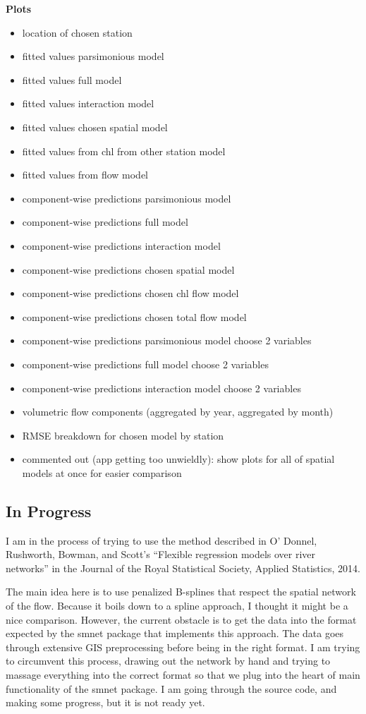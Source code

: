 \documentclass[12pt]{amsart}
\begin{document}
\textbf{Plots}
\begin{itemize}
\item location of chosen station
\item fitted values parsimonious model
\item fitted values full model
\item fitted values interaction model
\item fitted values chosen spatial model
\item fitted values from chl from other station model
\item fitted values from flow model
\item component-wise predictions parsimonious model
\item component-wise predictions full model
\item component-wise predictions interaction model
\item component-wise predictions chosen spatial model
\item component-wise predictions chosen chl flow model
\item component-wise predictions chosen total flow model
\item component-wise predictions parsimonious model choose 2 variables
\item component-wise predictions full model choose 2 variables
\item component-wise predictions interaction model choose 2 variables
\item volumetric flow components (aggregated by year, aggregated by month)
\item RMSE breakdown for chosen model by station
\item commented out (app getting too unwieldly): show plots for all of spatial models at once for easier comparison
\end{itemize}




\subsection{In Progress}

I am in the process of trying to use the method described in  O' Donnel, Rushworth, Bowman, and Scott's ``Flexible regression models over river networks'' in the Journal of the Royal Statistical Society, Applied Statistics, 2014.

The main idea here is to use penalized B-splines that respect the spatial network of the flow. Because it boils down to a spline approach, I thought it might be a nice comparison. However, the current obstacle is to get the data into the format expected by the smnet package that implements this approach. The data goes through extensive GIS preprocessing before being in the right format. I am trying to circumvent this process, drawing out the network by hand and trying to massage everything into the correct format so that we plug into the heart of main functionality of the smnet package. I am going through the source code, and making some progress, but it is not ready yet.
\end{document}
